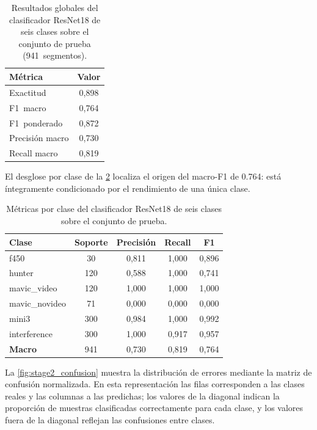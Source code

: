 \begin{table}[htbp]
\centering
\caption{Resultados globales del clasificador ResNet18 de seis clases sobre el conjunto de prueba (\num{941}~segmentos).}
\label{tab:stage2_global}
\begin{tabular}{lc}
\toprule
\textbf{Métrica} & \textbf{Valor} \\
\midrule
Exactitud       & 0,898 \\
F1~macro        & 0,764 \\
F1~ponderado    & 0,872 \\
Precisión macro & 0,730 \\
Recall macro    & 0,819 \\
\bottomrule
\end{tabular}
\end{table}

El desglose por clase de la \cref{tab:stage2_por_clase} localiza el origen del macro-F1 de \num{0,764}: está íntegramente condicionado por el rendimiento de una única clase.

\begin{table}[htbp]
\centering
\caption{Métricas por clase del clasificador ResNet18 de seis clases sobre el conjunto de prueba.}
\label{tab:stage2_por_clase}
\begin{tabular}{lcccc}
\toprule
\textbf{Clase}       & \textbf{Soporte} & \textbf{Precisión} & \textbf{Recall} & \textbf{F1} \\
\midrule
f450                 & 30               & 0,811              & 1,000           & 0,896 \\
hunter               & 120              & 0,588              & 1,000           & 0,741 \\
mavic\_video         & 120              & 1,000              & 1,000           & 1,000 \\
mavic\_novideo       & 71               & 0,000              & 0,000           & 0,000 \\
mini3                & 300              & 0,984              & 1,000           & 0,992 \\
interference         & 300              & 1,000              & 0,917           & 0,957 \\
\midrule
\textbf{Macro}       & 941              & 0,730              & 0,819           & 0,764 \\
\bottomrule
\end{tabular}
\end{table}

La \cref{fig:stage2_confusion} muestra la distribución de errores mediante la matriz de confusión normalizada. En esta representación las filas corresponden a las clases reales y las columnas a las predichas; los valores de la diagonal indican la proporción de muestras clasificadas correctamente para cada clase, y los valores fuera de la diagonal reflejan las confusiones entre clases.

